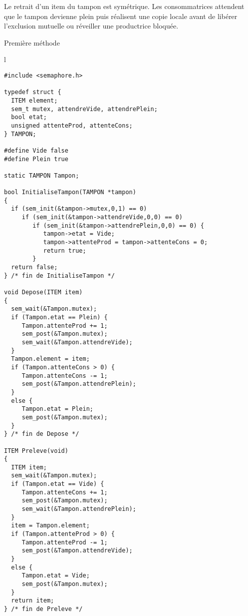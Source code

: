 Le retrait d'un item du tampon est symétrique. Les consommatrices attendent que le tampon devienne plein puis réalisent une copie locale avant de libérer l'exclusion mutuelle ou réveiller une productrice bloquée.
\begin{algorithm}[h!tp]
\caption{Première méthode}\label{prodcons:tampon1}
\centering
\begin{tabular}{l}
\lstset{language=C++}
\begin{lstlisting}
#include <semaphore.h>

typedef struct {
  ITEM element;
  sem_t mutex, attendreVide, attendrePlein;
  bool etat;
  unsigned attenteProd, attenteCons;
} TAMPON;

#define Vide false
#define Plein true

static TAMPON Tampon;

bool InitialiseTampon(TAMPON *tampon)
{
  if (sem_init(&tampon->mutex,0,1) == 0)
     if (sem_init(&tampon->attendreVide,0,0) == 0)
        if (sem_init(&tampon->attendrePlein,0,0) == 0) {
           tampon->etat = Vide;
           tampon->attenteProd = tampon->attenteCons = 0;
           return true;
        }
  return false;
} /* fin de InitialiseTampon */

void Depose(ITEM item)
{
  sem_wait(&Tampon.mutex);
  if (Tampon.etat == Plein) {
     Tampon.attenteProd += 1;
     sem_post(&Tampon.mutex);
     sem_wait(&Tampon.attendreVide);
  }
  Tampon.element = item;
  if (Tampon.attenteCons > 0) {
     Tampon.attenteCons -= 1;
     sem_post(&Tampon.attendrePlein);
  }
  else {
     Tampon.etat = Plein;
     sem_post(&Tampon.mutex);
  }
} /* fin de Depose */

ITEM Preleve(void)
{
  ITEM item;
  sem_wait(&Tampon.mutex);
  if (Tampon.etat == Vide) {
     Tampon.attenteCons += 1;
     sem_post(&Tampon.mutex);
     sem_wait(&Tampon.attendrePlein);
  }
  item = Tampon.element;
  if (Tampon.attenteProd > 0) {
     Tampon.attenteProd -= 1;
     sem_post(&Tampon.attendreVide);
  }
  else {
     Tampon.etat = Vide;
     sem_post(&Tampon.mutex);
  }
  return item;
} /* fin de Preleve */
\end{lstlisting}
\end{tabular}

\end{algorithm}

